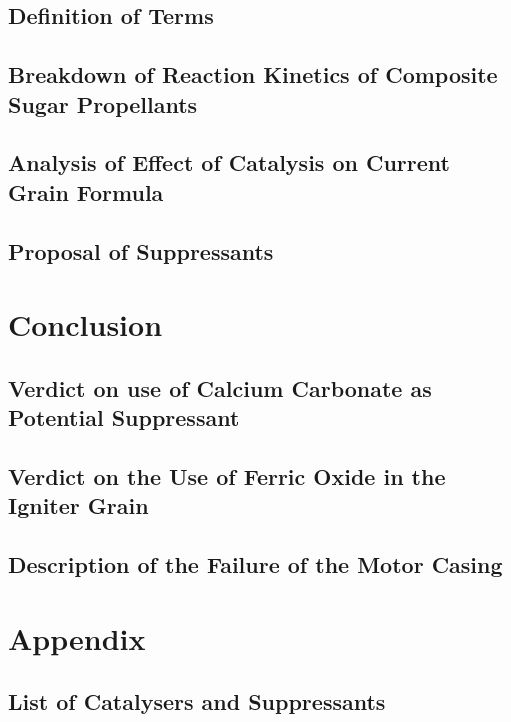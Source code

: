 \documentclass[12pt,letterpaper]{article}
\begin{document}
        \subsection{Definition of Terms}
            \lipsum[1]
            \subsection{Breakdown of Reaction Kinetics of Composite Sugar
			Propellants}
                    \lipsum[1-3]
        \subsection{Analysis of Effect of Catalysis on Current Grain Formula}
            \lipsum[1]
        \subsection{Proposal of Suppressants}

    \section{Conclusion}
        \subsection{Verdict on use of Calcium Carbonate as Potential Suppressant}
                \lipsum[1-3]
        \subsection{Verdict on the Use of Ferric Oxide in the Igniter Grain}
            \lipsum[1-2]
        \subsection{Description of the Failure of the Motor Casing}
            \lipsum[1-2]

    \section{Appendix}
    \subsection{List of Catalysers and Suppressants}
                \lipsum[1-2]
\end{document}
